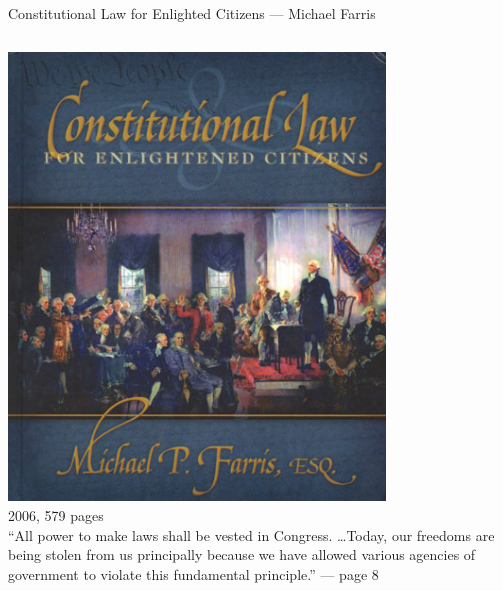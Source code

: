 \begin{frame}{Constitutional Law for Enlighted Citizens --- Michael Farris}
    \begin{columns}[onlytextwidth]
            \centering
            \includegraphics[width=0.75\textwidth]{img/constitutional-law.png} \\
            2006, 579 pages \\

            ``All power to make laws shall be vested in Congress. \ldots Today, our freedoms are being stolen from us principally because we have allowed various agencies of government to violate this fundamental principle.'' --- page 8
    \end{columns}
\end{frame}

